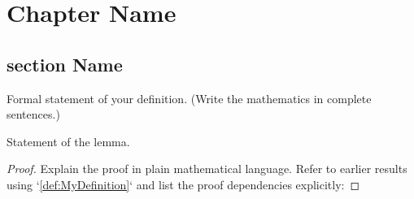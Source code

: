 \chapter {Chapter Name}

\section{section Name}

\begin{definition}
\label{def:MyDefinition}
Formal statement of your definition.  (Write the mathematics in
complete sentences.)

\leanok %
\end{definition}

\begin{lemma}
\label{lem:MyLemma}
Statement of the lemma.
\leanok
{} %
\end{lemma}

\begin{proof}
\leanok
Explain the proof in plain mathematical language.  Refer to earlier
results using `\ref{def:MyDefinition}` and list the proof dependencies
explicitly:
\end{proof}